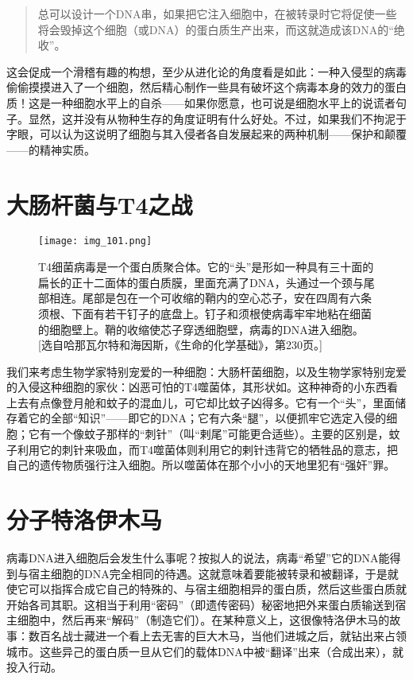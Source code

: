 \begin{quote}
总可以设计一个DNA串，如果把它注入细胞中，在被转录时它将促使一些将会毁掉这个细胞（或DNA）的蛋白质生产出来，而这就造成该DNA的“绝收”。
\end{quote}

这会促成一个滑稽有趣的构想，至少从进化论的角度看是如此：一种入侵型的病毒偷偷摸摸进入了一个细胞，然后精心制作一些具有破坏这个病毒本身的效力的蛋白质！这是一种细胞水平上的自杀——如果你愿意，也可说是细胞水平上的说谎者句子。显然，这并没有从物种生存的角度证明有什么好处。不过，如果我们不拘泥于字眼，可以认为这说明了细胞与其入侵者各自发展起来的两种机制——保护和颠覆——的精神实质。

\section{大肠杆菌与T4之战}

\begin{figure}
\texttt{[image: img\_101.png]}
\caption[T4细菌病毒。]
  {T4细菌病毒是一个蛋白质聚合体。它的“头”是形如一种具有三十面的扁长的正十二面体的蛋白质膜，里面充满了DNA，头通过一个颈与尾部相连。尾部是包在一个可收缩的鞘内的空心芯子，安在四周有六条须根、下面有若干钉子的底盘上。钉子和须根使病毒牢牢地粘在细菌的细胞壁上。鞘的收缩使芯子穿透细胞壁，病毒的DNA进入细胞。[选自哈那瓦尔特和海因斯，《生命的化学基础》，第230页。]}
\end{figure}

我们来考虑生物学家特别宠爱的一种细胞：大肠杆菌细胞，以及生物学家特别宠爱的入侵这种细胞的家伙：凶恶可怕的T4噬菌体，其形状如。这种神奇的小东西看上去有点像登月舱和蚊子的混血儿，可它却比蚊子凶得多。它有一个“头”，里面储存着它的全部“知识”——即它的DNA；它有六条“腿”，以便抓牢它选定入侵的细胞；它有一个像蚊子那样的“刺针”（叫“剌尾”可能更合适些）。主要的区别是，蚊子利用它的刺针来吸血，而T4噬菌体则利用它的剌针违背它的牺牲品的意志，把自己的遗传物质强行注入细胞。所以噬菌体在那个小小的天地里犯有“强奸”罪。

\section{分子特洛伊木马}

病毒DNA进入细胞后会发生什么事呢？按拟人的说法，病毒“希望”它的DNA能得到与宿主细胞的DNA完全相同的待遇。这就意味着要能被转录和被翻译，于是就使它可以指挥合成它自己的特殊的、与宿主细胞相异的蛋白质，然后这些蛋白质就开始各司其职。这相当于利用“密码”（即遗传密码）秘密地把外来蛋白质输送到宿主细胞中，然后再来“解码”（制造它们）。在某种意义上，这很像特洛伊木马的故事：数百名战士藏进一个看上去无害的巨大木马，当他们进城之后，就钻出来占领城市。这些异己的蛋白质一旦从它们的载体DNA中被“翻译”出来（合成出来），就投入行动。

